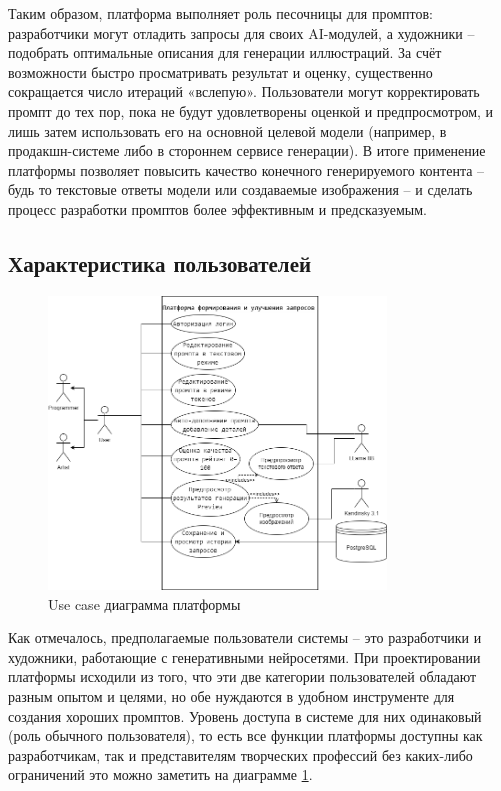 Таким образом, платформа выполняет роль песочницы для промптов: разработчики могут отладить запросы для своих AI-модулей, а художники – подобрать оптимальные описания для генерации иллюстраций. За счёт возможности быстро просматривать результат и оценку, существенно сокращается число итераций «вслепую». Пользователи могут корректировать промпт до тех пор, пока не будут удовлетворены оценкой и предпросмотром, и лишь затем использовать его на основной целевой модели (например, в продакшн-системе либо в стороннем сервисе генерации). В итоге применение платформы позволяет повысить качество конечного генерируемого контента – будь то текстовые ответы модели или создаваемые изображения – и сделать процесс разработки промптов более эффективным и предсказуемым.

\subsection{ Характеристика пользователей}
\begin{figure}[htbp]
    \centering
    \includegraphics[width=0.8\textwidth]{picture/Диплом use case.png}
    \caption{Use case диаграмма платформы}
    \label{usecase}
\end{figure}
Как отмечалось, предполагаемые пользователи системы – это разработчики и художники, работающие с генеративными нейросетями. При проектировании платформы исходили из того, что эти две категории пользователей обладают разным опытом и целями, но обе нуждаются в удобном инструменте для создания хороших промптов. Уровень доступа в системе для них одинаковый (роль обычного пользователя), то есть все функции платформы доступны как разработчикам, так и представителям творческих профессий без каких-либо ограничений это можно заметить на диаграмме \ref{usecase}.

